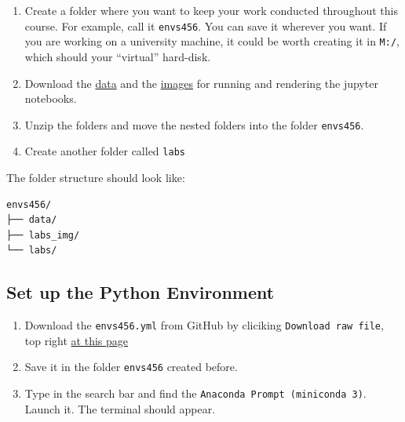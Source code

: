 \documentclass[
  letterpaper,
  DIV=11,
  numbers=noendperiod]{scrreprt}
\providecommand{\tightlist}{%
  \setlength{\itemsep}{0pt}\setlength{\parskip}{0pt}}\usepackage{longtable,booktabs,array}
\begin{document}
\begin{enumerate}
\def\labelenumi{\arabic{enumi}.}
\tightlist
\item
  Create a folder where you want to keep your work conducted throughout
  this course. For example, call it \texttt{envs456}. You can save it
  wherever you want. If you are working on a university machine, it
  could be worth creating it in \texttt{M:/}, which should your
  ``virtual'' hard-disk.
\item
  Download the
  \href{https://minhaskamal.github.io/DownGit/\#/home?url=https://github.com/GDSL-UL/wma/tree/main/data}{data}
  and the
  \href{https://minhaskamal.github.io/DownGit/\#/home?url=https://github.com/GDSL-UL/wma/tree/main/labs_img}{images}
  for running and rendering the jupyter notebooks.
\item
  Unzip the folders and move the nested folders into the folder
  \texttt{envs456}.
\item
  Create another folder called \texttt{labs}
\end{enumerate}

The folder structure should look like:

\begin{verbatim}
envs456/
├── data/
├── labs_img/
└── labs/
\end{verbatim}

\hypertarget{set-up-the-python-environment}{%
\subsection*{Set up the Python
Environment}\label{set-up-the-python-environment}}

\begin{enumerate}
\def\labelenumi{\arabic{enumi}.}
\tightlist
\item
  Download the \texttt{envs456.yml} from GitHub by cliciking
  \texttt{Download\ raw\ file}, top right
  \href{https://github.com/GDSL-UL/wma/blob/main/envs456.yml}{at this
  page}
\item
  Save it in the folder \texttt{envs456} created before.
\item
  Type in the search bar and find the
  \texttt{Anaconda\ Prompt\ (miniconda\ 3)}. Launch it. The terminal
  should appear.
\end{enumerate}
\end{document}
